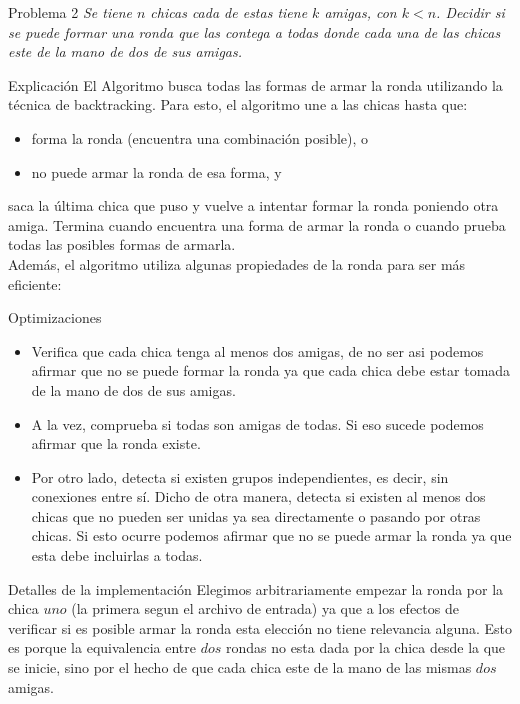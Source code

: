 \begin{section}{Problema 2}
	\textit{Se tiene $n$ chicas cada de estas tiene $k$ amigas, con $k<n$. Decidir si se puede formar una ronda que las contega a todas donde cada una de las chicas este de la mano de dos de sus amigas.}
	\begin{subsection}{Explicación}
		El Algoritmo busca todas las formas de armar la ronda utilizando la técnica de backtracking. Para esto, el algoritmo une a las chicas hasta que:
		\begin{itemize} \item forma la ronda (encuentra una combinación posible), o \item no puede armar la ronda de esa forma, y\end{itemize}
		
				saca la última chica que puso y vuelve a intentar formar la ronda poniendo otra amiga. Termina cuando encuentra una forma de armar la ronda o cuando prueba todas las posibles formas de armarla.\\
			
		Además, el algoritmo utiliza algunas propiedades de la ronda para ser más eficiente:
		\begin{subsubsection}{Optimizaciones}
		\begin{itemize} \item Verifica que cada chica tenga al menos dos amigas, de no ser asi podemos afirmar que no se puede formar la ronda ya que cada chica debe estar tomada de la mano de dos de sus amigas.
				\item A la vez, comprueba si todas son amigas de todas. Si eso sucede podemos afirmar que la ronda existe.
				\item Por otro lado, detecta si existen grupos independientes, es decir, sin conexiones entre sí. Dicho de otra manera, detecta si existen al menos dos chicas que no pueden ser unidas ya sea directamente o pasando por otras chicas. Si esto ocurre podemos afirmar que no se puede armar la ronda ya que esta debe incluirlas a todas. 
		\end{itemize}
			
		\end{subsubsection}
	\end{subsection}
	\begin{subsection}{Detalles de la implementación}
		Elegimos arbitrariamente empezar la ronda por la chica $uno$ (la primera segun el archivo de entrada) ya que a los efectos de verificar si es posible armar la ronda esta elección no tiene relevancia alguna. Esto es porque la equivalencia entre $dos$ rondas no esta dada por la chica desde la que se inicie, sino por el hecho de que cada chica este de la mano de las mismas $dos$ amigas.\\\\
	

\end{subsection}
\end{section}
